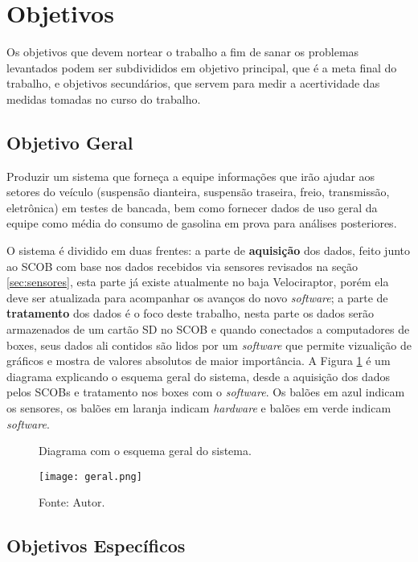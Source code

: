 \section{Objetivos}
\label{sec:objetivos}
Os objetivos que devem nortear o trabalho a fim de sanar os problemas levantados podem ser subdivididos em objetivo principal, que é a meta final do trabalho, e objetivos secundários, que servem para medir a acertividade das medidas tomadas no curso do trabalho.

\subsection{Objetivo Geral}

Produzir um sistema que forneça a equipe informações que irão ajudar aos setores do veículo (suspensão dianteira, suspensão traseira, freio, transmissão, eletrônica) em testes de bancada, bem como fornecer dados de uso geral da equipe como média do consumo de gasolina em prova para análises posteriores. 

O sistema é dividido em duas frentes: a parte de \textbf{aquisição} dos dados, feito junto ao SCOB com base nos dados recebidos via sensores revisados na seção \ref{sec:sensores}, esta parte já existe atualmente no baja Velociraptor, porém ela deve ser atualizada para acompanhar os avanços do novo \textit{software}; a parte de \textbf{tratamento} dos dados é o foco deste trabalho, nesta parte os dados serão armazenados de um cartão SD no SCOB e quando conectados a computadores de boxes, seus dados ali contidos são lidos por um \textit{software} que permite vizualição de gráficos e mostra de valores absolutos de maior importância. A Figura \ref{fig:geral} é um diagrama explicando o esquema geral do sistema, desde a aquisição dos dados pelos SCOBs e tratamento nos boxes com o \textit{software}. Os balões em azul indicam os sensores, os balões em laranja indicam \textit{hardware} e balões em verde indicam \textit{software}.         

\begin{figure}[!htb]
	\centering
		\caption{Diagrama com o esquema geral do sistema.}
		\texttt{[image: geral.png]} 
		\caption*{Fonte: Autor.}
		\label{fig:geral}
\end{figure} 


\subsection{Objetivos Específicos} 


